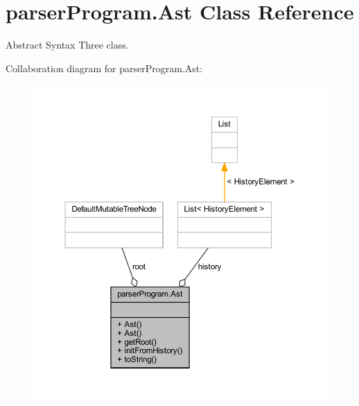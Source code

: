 \hypertarget{classparser_program_1_1_ast}{\section{parser\-Program.\-Ast Class Reference}
\label{classparser_program_1_1_ast}
}


Abstract Syntax Three class.  




Collaboration diagram for parser\-Program.\-Ast\-:\nopagebreak
\begin{figure}[H]
\begin{center}
\leavevmode
\includegraphics[width=350pt]{classparser_program_1_1_ast__coll__graph}
\end{center}
\end{figure}
